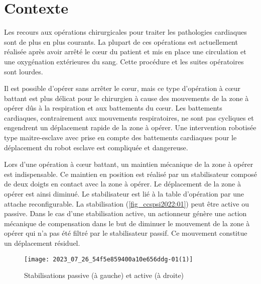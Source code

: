 %
%
%
%
%

\section*{Contexte}
Les recours aux opérations chirurgicales pour traiter les pathologies cardiaques sont de plus en plus courants. La plupart de ces opérations est actuellement réalisée après avoir arrêté le cœur du patient et mis en place une circulation et une oxygénation extérieures du sang. Cette procédure et les suites opératoires sont lourdes.

Il est possible d'opérer sans arrêter le cœur, mais ce type d'opération à cœur battant est plus délicat pour le chirurgien à cause des mouvements de la zone à opérer dûs à la respiration et aux battements du cœur. Les battements cardiaques, contrairement aux mouvements respiratoires, ne sont pas cycliques et engendrent un déplacement rapide de la zone à opérer. Une intervention robotisée type maitre-esclave avec prise en compte des battements cardiaques pour le déplacement du robot esclave est compliquée et dangereuse.

Lors d'une opération à cœur battant, un maintien mécanique de la zone à opérer est indispensable. Ce maintien en position est réalisé par un stabilisateur composé de deux doigts en contact avec la zone à opérer. Le déplacement de la zone à opérer est ainsi diminué. Le stabilisateur est lié à la table d'opération par une attache reconfigurable. La stabilisation (\autoref{fig_ccspsi2022:01}) peut être active ou passive. Dans le cas d'une stabilisation active, un actionneur génère une action mécanique de compensation dans le but de diminuer le mouvement de la zone à opérer qui n'a pas été filtré par le stabilisateur passif. Ce mouvement constitue un déplacement résiduel.
\begin{figure}[!h]
\centering
\texttt{[image: 2023\_07\_26\_54f5e859400a10e656ddg-01(1)]}
\caption{Stabilisations passive (à gauche) et active (à droite) \label{fig_ccspsi2022:01}}
\end{figure}

